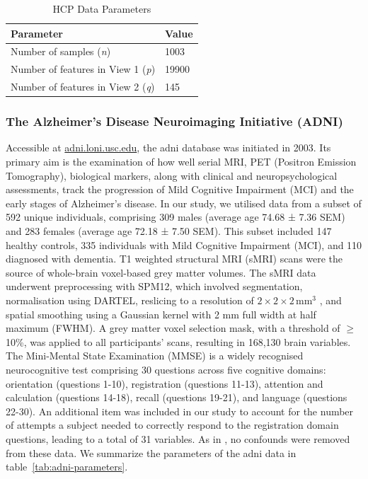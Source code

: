 \begin{table}
    \centering
    \caption{HCP Data Parameters}
    \begin{tabular}{| l | l |}
        \hline
        \textbf{Parameter}                        & \textbf{Value} \\
        \hline
        Number of samples (\textit{n})            & 1003           \\
        Number of features in View 1 (\textit{p}) & 19900          \\
        Number of features in View 2 (\textit{q}) & 145            \\
        \hline
    \end{tabular}\label{tab:hcp-parameters}
\end{table}

\subsubsection{The Alzheimer's Disease Neuroimaging Initiative (ADNI)}

Accessible at \url{adni.loni.usc.edu}, the \acrshort{adni} database was initiated in 2003. 
Its primary aim is the examination of how well serial MRI, PET (Positron Emission Tomography), biological markers, along with clinical and neuropsychological assessments, track the progression of Mild Cognitive Impairment (MCI) and the early stages of Alzheimer’s disease. 
In our study, we utilised data from a subset of 592 unique individuals, comprising 309 males (average age 74.68 ± 7.36 SEM) and 283 females (average age 72.18 ± 7.50 SEM). This subset included 147 healthy controls, 335 individuals with Mild Cognitive Impairment (MCI), and 110 diagnosed with dementia. 
T1 weighted structural MRI (sMRI) scans were the source of whole-brain voxel-based grey matter volumes. The sMRI data underwent preprocessing with SPM12\citep{ashburner2014spm12}, which involved segmentation, normalisation using DARTEL, reslicing to a resolution of \(2 \times 2 \times 2 \, \text{mm}^3\)
, and spatial smoothing using a Gaussian kernel with 2 mm full width at half maximum (FWHM). A grey matter voxel selection mask, with a threshold of $\geq$10\%, was applied to all participants' scans, resulting in 168,130 brain variables. 
The Mini-Mental State Examination (MMSE) is a widely recognised neurocognitive test comprising 30 questions across five cognitive domains: orientation (questions 1-10), registration (questions 11-13), attention and calculation (questions 14-18), recall (questions 19-21), and language (questions 22-30)\citep{folstein1975mini}. 
An additional item was included in our study to account for the number of attempts a subject needed to correctly respond to the registration domain questions, leading to a total of 31 variables. As in \citet{monteiro2016multiple}, no confounds were removed from these data.
We summarize the parameters of the \acrshort{adni} data in table~\ref{tab:adni-parameters}.

